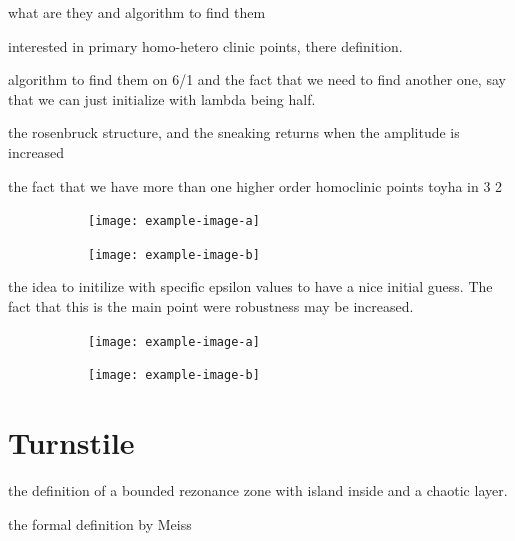 what are they and algorithm to find them

interested in primary homo-hetero clinic points, there definition.

algorithm to find them on 6/1 and the fact that we need to find another one, say that we can just initialize with lambda being half.

the rosenbruck structure, and the sneaking returns when the amplitude is increased

the fact that we have more than one
higher order homoclinic points
toyha in 3 2 

\begin{figure}[h!]
    \centering
    \begin{subfigure}[t]{0.49\textwidth}
        \centering
        \texttt{[image: example-image-a]}
        \caption{}
        \label{fig:}
    \end{subfigure}
    \hfill
    \begin{subfigure}[t]{0.49\textwidth}
        \centering
        \texttt{[image: example-image-b]}
        \caption{}
        \label{}
    \end{subfigure}
    \caption{}
    \label{}
\end{figure}

the idea to initilize with specific epsilon values to have a nice initial guess. The fact that this is the main point were robustness may be increased.

\begin{figure}[h!]
    \centering
    \begin{subfigure}[t]{0.49\textwidth}
        \centering
        \texttt{[image: example-image-a]}
        \caption{}
        \label{fig:}
    \end{subfigure}
    \hfill
    \begin{subfigure}[t]{0.49\textwidth}
        \centering
        \texttt{[image: example-image-b]}
        \caption{}
        \label{}
    \end{subfigure}
    \caption{}
    \label{}
\end{figure}

\section{Turnstile}

the definition of a bounded rezonance zone with island inside and a chaotic layer.

the formal definition by Meiss

